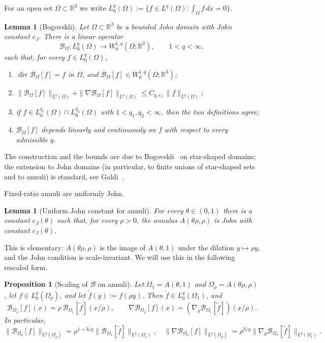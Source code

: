 \documentclass[11pt]{amsart}
\newtheorem{lemma}[theorem]{Lemma}
\newtheorem{proposition}[theorem]{Proposition}
\theoremstyle{definition}
\newcommand{\RR}{\mathbb{R}}
\newcommand{\BB}{\mathcal{B}}    %
\newcommand{\norm}[1]{\|#1\|}
\DeclareMathOperator{\dv}{div}
\begin{document}
For an open set $\Omega \subset \RR^3$ we write
$L^q_0(\Omega) := \{f \in L^q(\Omega) : \int_\Omega f\,dx = 0\}$.

\begin{lemma}[Bogovski\u{\i}]\label{lem:bogo}
Let $\Omega \subset \RR^3$ be a bounded John domain with John
constant $c_J$. There is a linear operator
\[
\BB_\Omega \colon L^q_0(\Omega) \to W^{1,q}_0(\Omega; \RR^3),
\qquad 1 < q < \infty,
\]
such that, for every $f \in L^q_0(\Omega)$,
\begin{enumerate}[label=(B\arabic*), itemsep=1pt]
\item $\dv \BB_\Omega[f] = f$ in $\Omega$, and
      $\BB_\Omega[f] \in W^{1,q}_0(\Omega; \RR^3)$;
\item $\norm{\BB_\Omega[f]}_{L^q(\Omega)} +
       \norm{\nabla \BB_\Omega[f]}_{L^q(\Omega)}
       \leq C_{q, c_J}\,\norm{f}_{L^q(\Omega)}$;
\item if $f \in L^{q_1}_0(\Omega) \cap L^{q_2}_0(\Omega)$ with
      $1 < q_1, q_2 < \infty$, then the two definitions agree;
\item $\BB_\Omega[f]$ depends linearly and continuously on $f$
      with respect to every admissible $q$.
\end{enumerate}
\end{lemma}

The construction and the bounds are due to
Bogovski\u{\i}~\cite{Bogovskii} on star-shaped domains; the
extension to John domains (in particular, to finite unions of
star-shaped sets and to annuli) is standard, see
Galdi~\cite[\S III.3]{Galdi}.

Fixed-ratio annuli are uniformly John.

\begin{lemma}[Uniform John constant for annuli]\label{lem:annulus-john}
For every $\theta \in (0, 1)$ there is a constant
$c_J(\theta)$ such that, for every $\rho > 0$, the annulus
$A(\theta\rho, \rho)$ is John with constant $c_J(\theta)$.
\end{lemma}

This is elementary: $A(\theta\rho, \rho)$ is the image of
$A(\theta, 1)$ under the dilation $y \mapsto \rho y$, and the
John condition is scale-invariant. We will use this in the
following rescaled form.

\begin{proposition}[Scaling of $\BB$ on annuli]
\label{prop:bogo-scale}
Let $\Omega_1 = A(\theta, 1)$ and $\Omega_\rho = A(\theta\rho,
\rho)$, let $f \in L^q_0(\Omega_\rho)$, and let $\tilde f(y) :=
f(\rho y)$. Then $\tilde f \in L^q_0(\Omega_1)$, and
\[
\BB_{\Omega_\rho}[f](x) = \rho\,\BB_{\Omega_1}[\tilde f](x/\rho),
\qquad
\nabla \BB_{\Omega_\rho}[f](x) = (\nabla_y \BB_{\Omega_1}[\tilde f])(x/\rho).
\]
In particular,
\begin{equation}\label{eq:bogo-scale}
\norm{\BB_{\Omega_\rho}[f]}_{L^q(\Omega_\rho)} = \rho^{1 + 3/q}
\norm{\BB_{\Omega_1}[\tilde f]}_{L^q(\Omega_1)},
\quad
\norm{\nabla \BB_{\Omega_\rho}[f]}_{L^q(\Omega_\rho)} = \rho^{3/q}
\norm{\nabla_y \BB_{\Omega_1}[\tilde f]}_{L^q(\Omega_1)}.
\end{equation}
\end{proposition}
\end{document}

